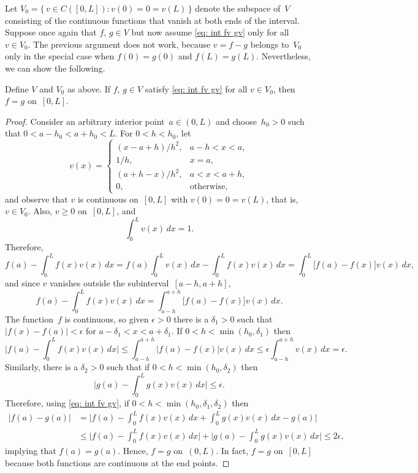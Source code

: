 Let $V_0=\{\,v\in C([0,L]):v(0)=0=v(L)\,\}$ denote the subspace of~$V$ 
consisting of the continuous functions that vanish at both ends of the interval.
Suppose once again that $f$, $g\in V$ but now assume \eqref{eq: int fv gv} 
only for all $v\in V_0$.  The previous argument does not work, because $v=f-g$ 
belongs to~$V_0$ only in the special case when $f(0)=g(0)$ and $f(L)=g(L)$.  
Nevertheless, we can show the following.

\begin{theorem}\label{thm: int fv gv}
Define $V$ and $V_0$ as above. If $f$, $g\in V$ satisfy \eqref{eq: int fv gv} 
for all $v\in V_0$, then $f=g$ on~$[0,L]$.
\end{theorem}
\begin{proof}
Consider an arbitrary interior point~$a\in(0,L)$ and choose~$h_0>0$ 
such that $0<a-h_0<a+h_0<L$.  For $0<h<h_0$, let
\[
v(x)=\begin{cases}
(x-a+h)/h^2,&a-h<x<a,\\
1/h,&x=a,\\
(a+h-x)/h^2,&a<x<a+h,\\
0,&\text{otherwise,}
\end{cases}
\]
and observe that $v$ is continuous on~$[0,L]$ with $v(0)=0=v(L)$, that is,
$v\in V_0$.  Also, $v\ge0$ on~$[0,L]$, and
\[
\int_0^Lv(x)\,dx=1.
\]
Therefore,
\[
f(a)-\int_0^Lf(x)v(x)\,dx=f(a)\int_0^Lv(x)\,dx-\int_0^Lf(x)v(x)\,dx
	=\int_0^L\bigl[f(a)-f(x)]v(x)\,dx,
\]
and since $v$ vanishes outside the subinterval~$[a-h,a+h]$,
\[
f(a)-\int_0^Lf(x)v(x)\,dx=\int_{a-h}^{a+h}\bigl[f(a)-f(x)]v(x)\,dx.
\]
The function~$f$ is continuous, so given $\epsilon>0$ there is a $\delta_1>0$
such that $|f(x)-f(a)|<\epsilon$ for $a-\delta_1<x<a+\delta_1$.  
If $0<h<\min(h_0,\delta_1)$ then
\[
\biggl|f(a)-\int_0^Lf(x)v(x)\,dx\biggr|
	\le\int_{a-h}^{a+h}\bigl|f(a)-f(x)|v(x)\,dx
	\le\epsilon\int_{a-h}^{a+h}v(x)\,dx=\epsilon.
\]
Similarly, there is a $\delta_2>0$ such that if $0<h<\min(h_0,\delta_2)$ then
\[
\biggl|g(a)-\int_0^Lg(x)v(x)\,dx\biggr|\le\epsilon.
\]
Therefore, using \eqref{eq: int fv gv}, if $0<h<\min(h_0,\delta_1,\delta_2)$ 
then
\begin{align*}
|f(a)-g(a)|&=\biggl|f(a)-\int_0^Lf(x)v(x)\,dx+\int_0^Lg(x)v(x)\,dx-g(a)\biggr|\\
	&\le\biggl|f(a)-\int_0^Lf(x)v(x)\,dx\biggr|
	+\biggl|g(a)-\int_0^Lg(x)v(x)\,dx\biggr|\le2\epsilon,
\end{align*}
implying that $f(a)=g(a)$.  Hence, $f=g$ on~$(0,L)$.  In fact, $f=g$ on~$[0,L]$ 
because both functions are continuous at the end points.
\end{proof}

